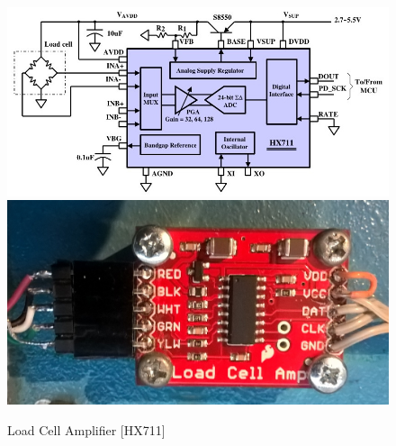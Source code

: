 \begin{figure}[H]
	\captionsetup{justification=raggedright,singlelinecheck=false}
	\centering
	\includegraphics[scale=0.35]{./image/PESTA/schematic/HX711_Schematic_1.jpg}
	\includegraphics[scale=0.1]{./image/PESTA/material/HX711_board_1.jpg}
	\caption{Load Cell Amplifier [HX711]}
	\label{HX711_Schematic_1}
\end{figure}
